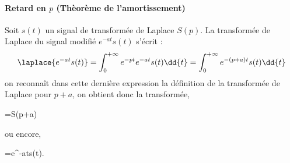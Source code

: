 \paragraph{Retard en $p$ (Thèorème de l'amortissement)}
Soit $s(t)$ un signal de transformée de Laplace $S(p)$. La transformée 
de Laplace du signal modifié $e^{-at}s(t)$ s'écrit :
\[
\laplace{e^{-at}s(t)}
=\int_{0}^{+\infty} e^{-pt}e^{-at}s(t)\dd{t}
=\int_{0}^{+\infty} e^{-(p+a)t}s(t)\dd{t}
\]
on reconnaît dans cette dernière expression la définition de la transformée 
de Laplace pour $p+a$, on obtient donc la transformée, 
\begin{bequation}
    =S(p+a)
\end{bequation}
ou encore,
\begin{bequation}
    =e^{-at}s(t).
\end{bequation}
